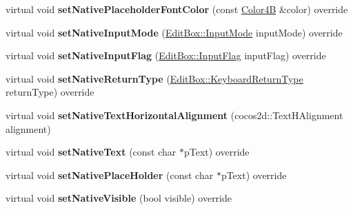 \begin{DoxyCompactItemize}
virtual void {\bfseries set\+Native\+Placeholder\+Font\+Color} (const \hyperlink{structColor4B}{Color4B} \&color) override
\item 
\mbox{\label{classui_1_1UIEditBoxImplWinrt_a3f70f31a9d551850befb95df4519a7b9}} 
virtual void {\bfseries set\+Native\+Input\+Mode} (\hyperlink{classui_1_1EditBox_a7a1bfe8f3ba218bedfcf5451ec3ce01a}{Edit\+Box\+::\+Input\+Mode} input\+Mode) override
\item 
\mbox{\label{classui_1_1UIEditBoxImplWinrt_af5e58b873deff37220a18ad12c0b71e9}} 
virtual void {\bfseries set\+Native\+Input\+Flag} (\hyperlink{classui_1_1EditBox_af02f13ee9fba51d59bb3111e200848c8}{Edit\+Box\+::\+Input\+Flag} input\+Flag) override
\item 
\mbox{\label{classui_1_1UIEditBoxImplWinrt_af060b6f0a33fda30e9a154988940521c}} 
virtual void {\bfseries set\+Native\+Return\+Type} (\hyperlink{classui_1_1EditBox_a1e1285b6f742975b26bdeb8108ca6e51}{Edit\+Box\+::\+Keyboard\+Return\+Type} return\+Type) override
\item 
\mbox{\label{classui_1_1UIEditBoxImplWinrt_a7d180b824f707c963271155196abba5d}} 
virtual void {\bfseries set\+Native\+Text\+Horizontal\+Alignment} (cocos2d\+::\+Text\+H\+Alignment alignment)
\item 
\mbox{\label{classui_1_1UIEditBoxImplWinrt_abd21fbdd8e2901924d1b7d8c864bce3e}} 
virtual void {\bfseries set\+Native\+Text} (const char $\ast$p\+Text) override
\item 
\mbox{\label{classui_1_1UIEditBoxImplWinrt_a105a79c79802612715ed697e70a48d6a}} 
virtual void {\bfseries set\+Native\+Place\+Holder} (const char $\ast$p\+Text) override
\item 
\mbox{\label{classui_1_1UIEditBoxImplWinrt_a2761b8ab1df1283c5b9983ad2a957d74}} 
virtual void {\bfseries set\+Native\+Visible} (bool visible) override
\item 
\mbox{\label{classui_1_1UIEditBoxImplWinrt_a229a5cb4066426739305d97a3d87dd35}} 

\end{DoxyCompactItemize}
